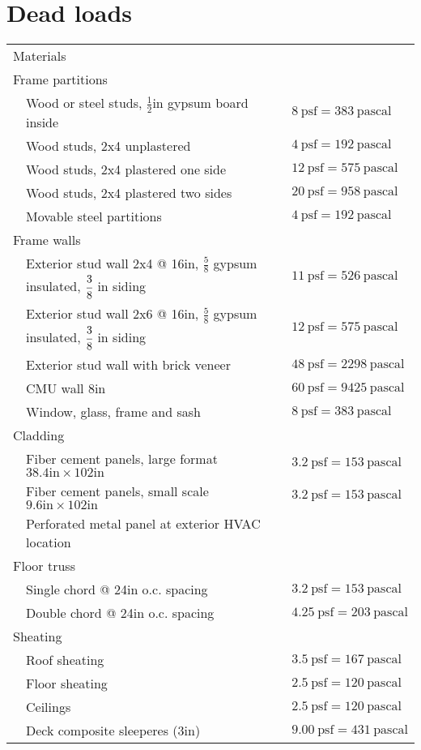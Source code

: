 
\section{Dead loads}
\begin{table}[h!]
\begin{tabular}{lp{8cm}p{10cm}}
\multicolumn{3}{l}{Materials}\\


\multicolumn{3}{l}{Frame partitions}\\
& Wood or steel studs, $\frac{1}{2}$in gypsum board inside & $8\ \mathrm{psf}= 383 \ \mathrm{pascal}$ \\
& Wood studs, 2x4 unplastered & $4\ \mathrm{psf}=192 \ \mathrm{pascal}$\\
& Wood studs, 2x4 plastered one side & $12\ \mathrm{psf}= 575\ \mathrm{pascal}$\\
& Wood studs, 2x4 plastered two sides & $20\ \mathrm{psf}=958 \ \mathrm{pascal}$\\
& Movable steel partitions &  $4\ \mathrm{psf}=192 \ \mathrm{pascal}$\\
\multicolumn{3}{l}{Frame walls}\\
& Exterior stud wall 2x4 @ 16in, $\frac{5}{8}$ gypsum insulated, $\cfrac{3}{8}$ in siding &  $11\ \mathrm{psf}=526 \ \mathrm{pascal}$\\
& Exterior stud wall 2x6 @ 16in, $\frac{5}{8}$ gypsum insulated, $\cfrac{3}{8}$ in siding &  $12\ \mathrm{psf}=575 \ \mathrm{pascal}$\\
& Exterior stud wall with brick veneer &   $48\ \mathrm{psf}=2298 \ \mathrm{pascal}$\\
& CMU wall 8in &   $60\ \mathrm{psf}=9425 \ \mathrm{pascal}$\\
& Window, glass, frame and sash & $8\ \mathrm{psf}=383 \ \mathrm{pascal}$\\
\multicolumn{3}{l}{Cladding}\\
& Fiber cement panels, large format $38.4\text{in} \times 102\text{in}$ & $3.2\ \mathrm{psf} = 153\ \mathrm{pascal}$ \\
& Fiber cement panels, small scale $9.6\text{in} \times 102\text{in}$ & $3.2\ \mathrm{psf} = 153\ \mathrm{pascal}$ \\
& Perforated metal panel at exterior HVAC location & \\
\multicolumn{3}{l}{Floor truss}\\
& Single chord @ 24in o.c. spacing & $3.2\ \mathrm{psf} = 153\ \mathrm{pascal}$ \\
& Double chord @ 24in o.c. spacing & $4.25\ \mathrm{psf} = 203\ \mathrm{pascal}$ \\
\multicolumn{3}{l}{Sheating}\\
& Roof sheating & $ 3.5\ \mathrm{psf} = 167\ \mathrm{pascal}$ \\
& Floor sheating & $ 2.5\ \mathrm{psf} = 120\ \mathrm{pascal}$ \\
& Ceilings & $ 2.5\ \mathrm{psf} = 120\ \mathrm{pascal}$ \\
& Deck composite sleeperes (3in) &  $9.00\ \mathrm{psf} = 431\ \mathrm{pascal}$ \\
\end{tabular}
\end{table}

